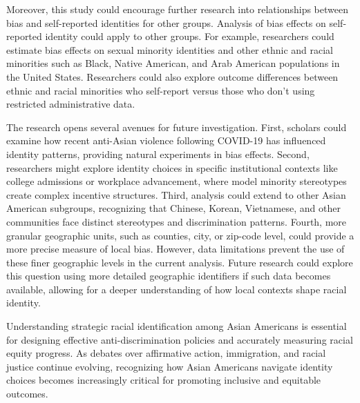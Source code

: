 Moreover, this study could encourage further research into relationships between bias and self-reported identities for other groups. Analysis of bias effects on self-reported identity could apply to other groups. For example, researchers could estimate bias effects on sexual minority identities and other ethnic and racial minorities such as Black, Native American, and Arab American populations in the United States. Researchers could also explore outcome differences between ethnic and racial minorities who self-report versus those who don't using restricted administrative data.

The research opens several avenues for future investigation. First, scholars could examine how recent anti-Asian violence following COVID-19 has influenced identity patterns, providing natural experiments in bias effects. Second, researchers might explore identity choices in specific institutional contexts like college admissions or workplace advancement, where model minority stereotypes create complex incentive structures. Third, analysis could extend to other Asian American subgroups, recognizing that Chinese, Korean, Vietnamese, and other communities face distinct stereotypes and discrimination patterns. Fourth, more granular geographic units, such as counties, city, or zip-code level, could provide a more precise measure of local bias. However, data limitations prevent the use of these finer geographic levels in the current analysis. Future research could explore this question using more detailed geographic identifiers if such data becomes available, allowing for a deeper understanding of how local contexts shape racial identity.

Understanding strategic racial identification among Asian Americans is essential for designing effective anti-discrimination policies and accurately measuring racial equity progress. As debates over affirmative action, immigration, and racial justice continue evolving, recognizing how Asian Americans navigate identity choices becomes increasingly critical for promoting inclusive and equitable outcomes.